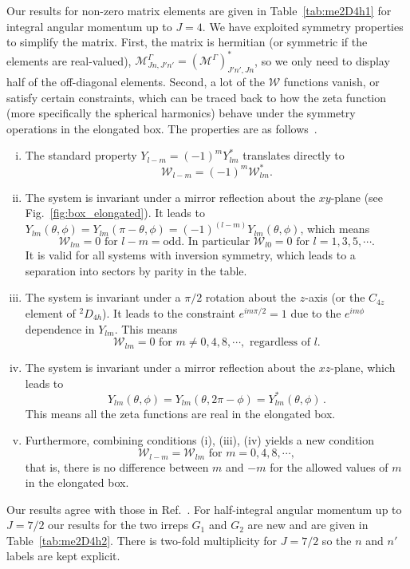 \documentclass[aps,prd,reprint,showpacs,floatfix,longbibliography,,superscriptaddress]{revtex4-1}
\def\mw{\mathcal{W}}
\def\beq{\begin{equation}}
\def\eeq{\end{equation}}
\begin{document}
\begin{widetext}
Our results for non-zero matrix elements are given in Table~\ref{tab:me2D4h1} for integral angular momentum up to $J=4$. 
We have  exploited symmetry properties to simplify the matrix.
First, the matrix is hermitian (or symmetric if the elements are real-valued), $ \mathcal{M}^\Gamma_{J n , J' n'} = \left( \mathcal{M}^\Gamma \right)^*_{J' n', J n}$, 
so we only need to display half of the off-diagonal elements. 
Second, a lot of the $\mw$ functions vanish, or satisfy certain constraints, 
which can be traced back to how the zeta function (more specifically the spherical harmonics)
behave under the symmetry operations in the elongated box.
The properties are as follows~\cite{Leskovec:2012gb,Gockeler:2012yj}.
\begin{enumerate}[(i)]
\item 
The standard property  $Y_{l-m}=(-1)^m Y^*_{lm}$ translates directly to 
\beq \mw_{l-m}=(-1)^m \mw^*_{lm}. \label{eq:w1} \eeq  
\item 
The system is invariant under a mirror reflection about the $xy$-plane  (see Fig.~\ref{fig:box_elongated}).
It leads to $Y_{lm}(\theta,\phi)=Y_{lm}(\pi-\theta,\phi)=(-1)^{(l-m)} Y_{lm}(\theta,\phi)$, which means 
\beq \mw_{lm}=0 \text{  for  } l-m = \text{odd.  In particular  } \mw_{l0}=0  \text{  for  } l = 1,3,5,\cdots.  \label{eq:w2}  \eeq
It is valid for all systems with inversion symmetry, which leads 
to a separation into sectors by parity in the table.
\item 
The system is invariant under a $\pi/2$ rotation about the $z$-axis (or the $C_{4z}$ element of $^2D_{4h}$). 
It leads to the constraint $e^{im\pi/2}=1$ due to the $e^{im\phi}$ dependence in $Y_{lm}$.
This means 
\beq \mw_{lm}=0 \text{  for  }  m \neq  0, 4, 8, \cdots, \text{ regardless of } l.  \label{eq:w3}  \eeq 
\item 
The system is invariant under a mirror reflection about the $xz$-plane,
which leads to 
\beq Y_{lm}(\theta,\phi)=Y_{lm}(\theta,2\pi-\phi)= Y^*_{lm}(\theta,\phi)\,.  
\label{eq:w4}  
\eeq 
This means all the zeta functions are real in the elongated box. 
\item 
Furthermore, combining conditions (i), (iii), (iv) yields a new condition  
\beq \mw_{l-m}= \mw_{lm} \text{  for  }  m=  0, 4, 8, \cdots, \label{eq:w5} \eeq
that is, there is  no difference between $m$ and $-m$ for the allowed values of $m$ in the elongated box.
\end{enumerate}
%
Our results agree with those in Ref.~\cite{Feng:2004ua}. 
For half-integral angular momentum up to $J=7/2$ our results for the two irreps $G_1$ and $G_2$ are new 
and are  given in Table~\ref{tab:me2D4h2}. There is two-fold multiplicity for $J=7/2$ so the $n$ and $n'$ labels are kept explicit.


\end{widetext}
\end{document}

